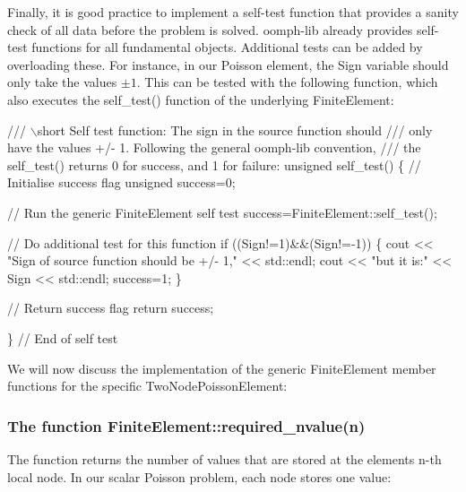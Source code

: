 Finally, it is good practice to implement a self-\/test function that provides a sanity check of all data before the problem is solved. {\ttfamily oomph-\/lib} already provides self-\/test functions for all fundamental objects. Additional tests can be added by overloading these. For instance, in our Poisson element, the {\ttfamily Sign} variable should only take the values $ \pm 1 $. This can be tested with the following function, which also executes the {\ttfamily self\+\_\+test()} function of the underlying {\ttfamily Finite\+Element\+:}  
\begin{DoxyCodeInclude}
\textcolor{comment}{  /// \(\backslash\)short Self test function: The sign in the source function should}
\textcolor{comment}{}\textcolor{comment}{  /// only have the values +/- 1. Following the general oomph-lib convention,}
\textcolor{comment}{}\textcolor{comment}{  /// the self\_test() returns 0 for success, and 1 for failure:}
\textcolor{comment}{}  \textcolor{keywordtype}{unsigned} self\_test()
   \{
    \textcolor{comment}{// Initialise success flag}
    \textcolor{keywordtype}{unsigned} success=0;

    \textcolor{comment}{// Run the generic FiniteElement self test}
    success=FiniteElement::self\_test();

    \textcolor{comment}{// Do additional test for this function}
    \textcolor{keywordflow}{if} ((Sign!=1)&&(Sign!=-1))
     \{
      cout << \textcolor{stringliteral}{"Sign of source function should be +/- 1,"} << std::endl;
      cout << \textcolor{stringliteral}{"but it is:"} << Sign << std::endl;
      success=1;
     \}

    \textcolor{comment}{// Return success flag}
    \textcolor{keywordflow}{return} success;

   \} \textcolor{comment}{// End of self test}

\end{DoxyCodeInclude}


We will now discuss the implementation of the generic {\ttfamily Finite\+Element} member functions for the specific {\ttfamily Two\+Node\+Poisson\+Element\+:} \hypertarget{index_Fereq_nvalue}{}\subsubsection{The function Finite\+Element\+::required\+\_\+nvalue(n)}\label{index_Fereq_nvalue}
The function returns the number of values that are stored at the element\textquotesingle{}s {\ttfamily n-\/th} local node. In our scalar Poisson problem, each node stores one value\+:

